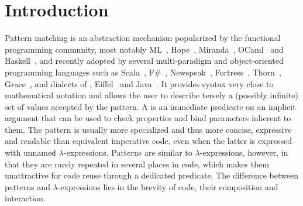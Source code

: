 \section{Introduction} %
\label{sec:intro}


Pattern matching is an abstraction mechanism popularized by the functional
programming community, most notably ML~\cite{ML78}, Hope~\cite{BMS80}, 
Miranda~\cite{Miranda85}, OCaml~\cite{OPM01} and Haskell~\cite{haskell90},
and recently adopted by several multi-paradigm and object-oriented programming 
languages such as Scala~\cite{Scala2nd}, F\#~\cite{Syme07}, 
Newspeak~\cite{geller2010pattern}, Fortress~\cite{RPS10}, 
Thorn~\cite{Thorn2012}, Grace~\cite{Grace2012}, and dialects of 
\Cpp{}\cite{Prop96,App}, Eiffel~\cite{Moreau:2003} and 
Java~\cite{Odersky97pizzainto,Liu03jmatch:iterable,HydroJ2003,OOMatch07thesis,padl08}.
It provides syntax very close to mathematical notation and allows the user to 
describe tersely a (possibly infinite) set of values accepted by the pattern. 
A  is an immediate predicate on an implicit argument that can be 
used to check properties and bind parameters inherent to them. The pattern is 
usually more specialized and thus more concise, expressive and readable than 
equivalent imperative code, even when the latter is expressed with unnamed 
$\lambda$-expressions. Patterns are similar to $\lambda$-expressions, however, in 
that they are rarely repeated in several places in code, which makes them 
unattractive for code reuse through a dedicated predicate. The difference 
between patterns and $\lambda$-expressions lies in the brevity of code, their 
composition and interaction.


